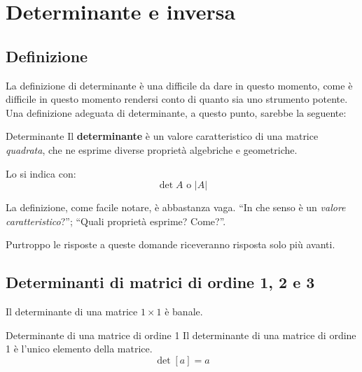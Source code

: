 \chapter{Determinante e inversa}
\section{Definizione}
La definizione di determinante è una difficile da dare in questo momento, come è difficile in questo momento rendersi conto di quanto sia uno strumento potente. Una definizione adeguata di determinante, a questo punto, sarebbe la seguente:
\begin{newdef}{Determinante}
    Il \textbf{determinante} è un valore caratteristico di una matrice \textit{quadrata}, che ne esprime diverse proprietà algebriche e geometriche.

    Lo si indica con:
    \[
        \det A \text{ o } |A|
    \]
\end{newdef}
La definizione, come facile notare, è abbastanza vaga. ``In che senso è un \textit{valore caratteristico}?''; ``Quali proprietà esprime? Come?''.

Purtroppo le risposte a queste domande riceveranno risposta solo più avanti.

\section{Determinanti di matrici di ordine 1, 2 e 3}
Il determinante di una matrice $1 \times 1$ è banale.

\begin{teo}{Determinante di una matrice di ordine 1}
    Il determinante di una matrice di ordine 1 è l'unico elemento della matrice.
    \[
        \det[a] = a
    \]
\end{teo}

